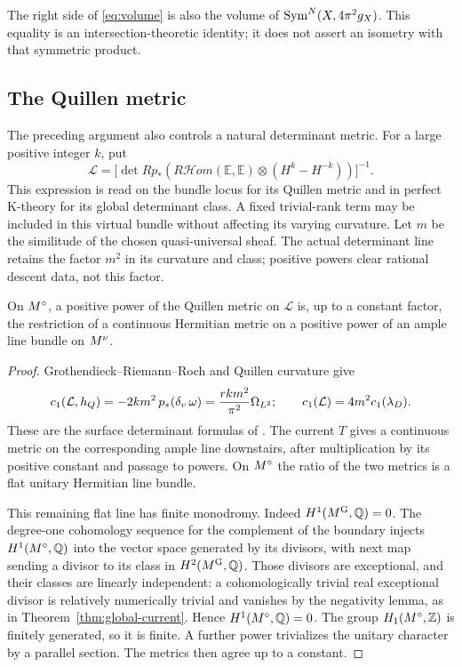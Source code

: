 The right side of \eqref{eq:volume} is also the volume of
$\operatorname{Sym}^N(X,4\pi^2g_X)$. This equality is an intersection-theoretic identity;
it does not assert an isometry with that symmetric product.

\subsection{The Quillen metric}
The preceding argument also controls a natural determinant metric. For a
large positive integer $k$, put
\begin{equation}\label{eq:quillen-line}
 \mathcal L=\big[\det Rp_*(R\mathcal Hom(\mathbb E,\mathbb E)\otimes
                  (H^k-H^{-k}))\big]^{-1}.
\end{equation}
This expression is read on the bundle locus for its Quillen metric and
in perfect K-theory for its global determinant class.
A fixed trivial-rank term may be included in this virtual bundle without
affecting its varying curvature. Let $m$ be the similitude of the chosen quasi-universal sheaf. The
actual determinant line retains the factor $m^2$ in its curvature and
class; positive powers clear rational descent data, not this factor.

\begin{corollary}\label{cor:quillen}
On $M^{\circ}$, a positive power of the Quillen metric on $\mathcal L$ is,
up to a constant factor, the restriction of a continuous Hermitian metric
on a positive power of an ample line bundle on $M^{\nu}$.
\end{corollary}
\begin{proof}
Grothendieck--Riemann--Roch and Quillen curvature give
\[
 c_1(\mathcal L,h_Q)=-2km^2\,p_*(\delta_v\,\omega)
                   =\frac{rkm^2}{\pi^2}\Omega_{L^2};
 \qquad c_1(\mathcal L)=4m^2c_1(\lambda_D).
\]
These are the surface determinant formulas of
\cite[Theorem~4.6]{BS16}. The current $T$ gives a continuous metric on the
corresponding ample line downstairs, after multiplication by its positive
constant and passage to powers. On $M^{\circ}$ the ratio of the two metrics is a
flat unitary Hermitian line bundle.

This remaining flat line has finite monodromy. Indeed $H^1(M^{\mathrm G},\mathbb Q)=0$.
The degree-one cohomology sequence for the complement of the boundary
injects $H^1(M^{\circ},\mathbb Q)$ into the vector space generated by its divisors,
with next map sending a divisor to its class in $H^2(M^{\mathrm G},\mathbb Q)$.
Those divisors are exceptional, and their classes are linearly independent:
a cohomologically trivial real exceptional divisor is relatively
numerically trivial and vanishes by the negativity lemma, as in
Theorem~\ref{thm:global-current}. Hence $H^1(M^{\circ},\mathbb Q)=0$.
The group $H_1(M^{\circ},\mathbb Z)$ is finitely generated, so it is finite.
A further power trivializes the unitary character by a parallel section.
The metrics then agree up to a constant.
\end{proof}

